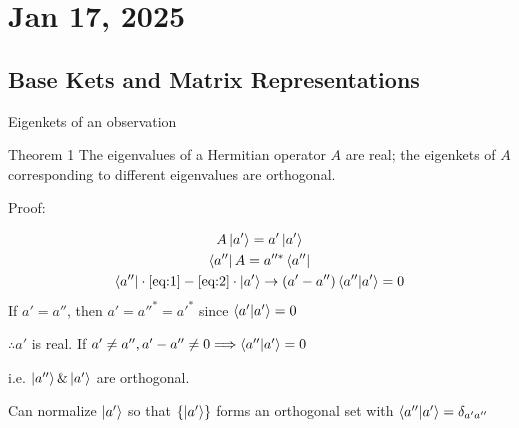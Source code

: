 \section{Jan 17, 2025}
\subsection{Base Kets and Matrix Representations}
\begin{frame}{Eigenkets of an observation}
	\begin{alertblock}{Theorem 1}
		The eigenvalues of a Hermitian operator $A$ are real; the eigenkets of $A$ corresponding to different eigenvalues are orthogonal.
	\end{alertblock}
	Proof:

	\begin{gather}
		A\ket{a'} = a'\ket{a'} \label{eq:1}\\
		\bra{a'' }A = a''^* \bra{a''} \label{eq:2}\\
		\bra{a''} \cdot \ref{eq:1} - \ref{eq:2}\cdot \ket{a'} \to (a'-a'') \ip{a''}{a'} = 0
	\end{gather}
	If $a'=a''$, then $a'=a''^*=a'^*$ since $\ip{a'}{a'} = 0$

	$\therefore a'$ is real. If $a'\ne a'', a'-a'' \ne 0 \Longrightarrow \ip{a''}{a'} = 0$

	i.e. $\ket{a''} \& \ket{a'}$ are orthogonal.

\end{frame}
\begin{frame}
	Can normalize $\ket{a'}$ so that $\{\ket{a'}\}$ forms an orthogonal set with $\ip{a''}{a'}= \delta_{a' a''	}$
\end{frame}
